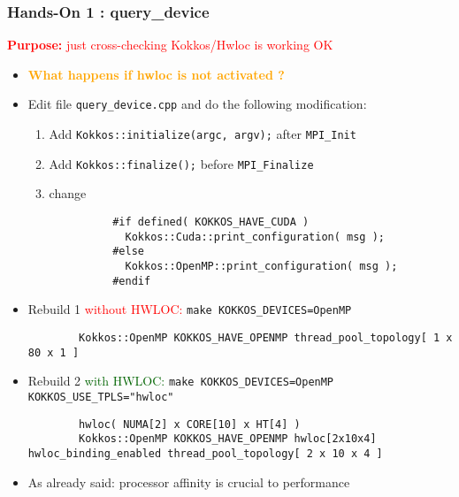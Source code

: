 \begin{frame}[fragile=singleslide]
  \frametitle{Hands-On 1 : query\_device}

  {\large\textcolor{red}{\textbf{Purpose:} just cross-checking Kokkos/Hwloc is working OK}}

  \begin{itemize}
  \item \textcolor{orange}{\textbf{What happens if hwloc is not activated ?}}
  \item Edit file \texttt{query\_device.cpp} and do the following modification:
    \begin{enumerate}
    \item Add \texttt{Kokkos::initialize(argc, argv);} after \texttt{MPI\_Init}
    \item Add \texttt{Kokkos::finalize();} before \texttt{MPI\_Finalize}
    \item change\\
      {\small
        \begin{verbatim}
          #if defined( KOKKOS_HAVE_CUDA )
            Kokkos::Cuda::print_configuration( msg );
          #else
            Kokkos::OpenMP::print_configuration( msg );
          #endif
        \end{verbatim}
      }
    \end{enumerate}
  \item {\small Rebuild 1 \textcolor{red}{without HWLOC:} \texttt{make KOKKOS\_DEVICES=OpenMP}}
    {\small
      \begin{verbatim}
        Kokkos::OpenMP KOKKOS_HAVE_OPENMP thread_pool_topology[ 1 x 80 x 1 ]
      \end{verbatim}
    }
  \item {\small Rebuild 2 \textcolor{darkgreen}{with HWLOC:} \texttt{make KOKKOS\_DEVICES=OpenMP KOKKOS\_USE\_TPLS="hwloc"}}
    {\small 
      \begin{verbatim}
        hwloc( NUMA[2] x CORE[10] x HT[4] )
        Kokkos::OpenMP KOKKOS_HAVE_OPENMP hwloc[2x10x4] hwloc_binding_enabled thread_pool_topology[ 2 x 10 x 4 ]      
      \end{verbatim}
    }
    \item As already said: processor affinity is crucial to performance
  \end{itemize}

\end{frame}
